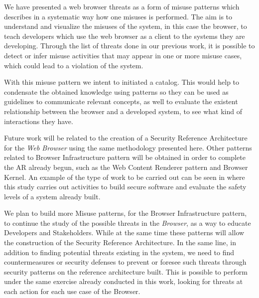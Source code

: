 \documentclass{sig-alternate-05-2015}
\begin{document}


We have presented a web browser threats as a form of misuse patterns which describes in a systematic way how one misuses is performed. The aim is to understand and visualize  the misuses of the system, in this case the browser, to teach developers which use the web browser as a client to the systems they are developing. Through the list of threats done in our previous work, it is possible to detect or infer misuse activities that may appear in one or more misuse cases, which could lead to a violation of the system.

With this misuse pattern we intent to initiated a catalog. This would help to condensate the obtained knowledge using patterns so they can be used as guidelines to communicate relevant concepts, as well to evaluate the existent relationship between the browser and a developed system, to see what kind of interactions they have.

Future work will be related to the creation of a Security Reference Architecture for the \textit{Web Browser} using the same methodology presented here. Other patterns related to Browser Infrastructure pattern will be obtained in order to complete the AR already begun, such as the Web Content Renderer pattern and Browser Kernel. An example of the type of work to be carried out can be seen in \cite{Fernandez2015} where this study carries out activities to build secure software and evaluate the safety levels of a system already built.

We plan to build more Misuse patterns, for the Browser Infrastructure pattern, to continue the study of the possible threats in the \textit{Browser}, as a way to educate Developers and Stakeholders. While at the same time these patterns will allow the construction of the Security Reference Architecture. In the same line, in addition to finding potential threats existing in the system, we need to find countermeasures or security defenses to prevent or foresee such threats through security patterns on the reference architecture built. This is possible to perform under the same exercise already conducted in this work, looking for threats at each action for each use case of the Browser.

  

\end{document}
